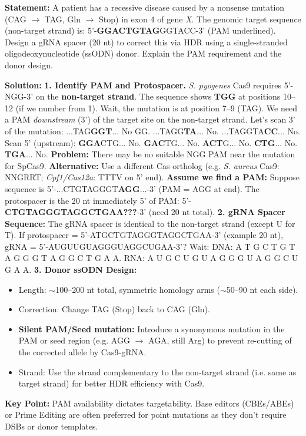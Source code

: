 \documentclass[11pt]{article}
\begin{document}
\begin{exoresolu}
\textbf{Statement:} A patient has a recessive disease caused by a nonsense mutation (CAG $\rightarrow$ TAG, Gln $\rightarrow$ Stop) in exon 4 of gene \emph{X}. The genomic target sequence (non-target strand) is: 5'-\textbf{GGACTG\textcolor{popred}{TAG}}GGTACC-3' (PAM underlined). Design a gRNA spacer (20 nt) to correct this via HDR using a single-stranded oligodeoxynucleotide (ssODN) donor. Explain the PAM requirement and the donor design.

\textbf{Solution:}
\textbf{1. Identify PAM and Protospacer.} \emph{S. pyogenes} Cas9 requires 5'-NGG-3' on the \textbf{non-target strand}. The sequence shows \textbf{TGG} at positions 10–12 (if we number from 1). Wait, the mutation is at position 7–9 (TAG). We need a PAM \emph{downstream} (3') of the target site on the non-target strand.
Let's scan 3' of the mutation: ...TAG\textbf{GGT}... No GG. ...TAGG\textbf{TA}... No. ...TAGGTA\textbf{CC}... No.
Scan 5' (upstream): \textbf{GGA}CTG... No. \textbf{GAC}TG... No. \textbf{ACT}G... No. \textbf{CTG}... No. \textbf{TGA}... No.
\textbf{Problem:} There may be no suitable NGG PAM near the mutation for SpCas9.
\textbf{Alternative:} Use a different Cas ortholog (e.g. \emph{S. aureus} Cas9: NNGRRT; \emph{Cpf1/Cas12a}: TTTV on 5' end).
\textbf{Assume we find a PAM:} Suppose sequence is 5'-...CTGTAGGGT\textbf{AGG}...-3' (PAM = AGG at end). The protospacer is the 20 nt immediately 5' of PAM: 5'-\textbf{CTGTAGGGTAGGCTGAA???}-3' (need 20 nt total).
\textbf{2. gRNA Spacer Sequence:} The gRNA spacer is identical to the non-target strand (except U for T). If protospacer = 5'-ATGCTGTAGGGTAGGCTGAA-3' (example 20 nt), gRNA = 5'-AUGUUGUAGGGUAGGCUGAA-3'? Wait: DNA: A T G C T G T A G G G T A G G C T G A A. RNA: A U G C U G U A G G G U A G G C U G A A.
\textbf{3. Donor ssODN Design:}
\begin{itemize}
    \item Length: $\sim$100–200 nt total, symmetric homology arms ($\sim$50–90 nt each side).
    \item Correction: Change TAG (Stop) back to CAG (Gln).
    \item \textbf{Silent PAM/Seed mutation:} Introduce a synonymous mutation in the PAM or seed region (e.g. AGG $\rightarrow$ AGA, still Arg) to prevent re-cutting of the corrected allele by Cas9-gRNA.
    \item Strand: Use the strand complementary to the non-target strand (i.e. same as target strand) for better HDR efficiency with Cas9.
\end{itemize}
\textbf{Key Point:} PAM availability dictates targetability. Base editors (CBEs/ABEs) or Prime Editing are often preferred for point mutations as they don't require DSBs or donor templates.
\end{exoresolu}
\end{document}
